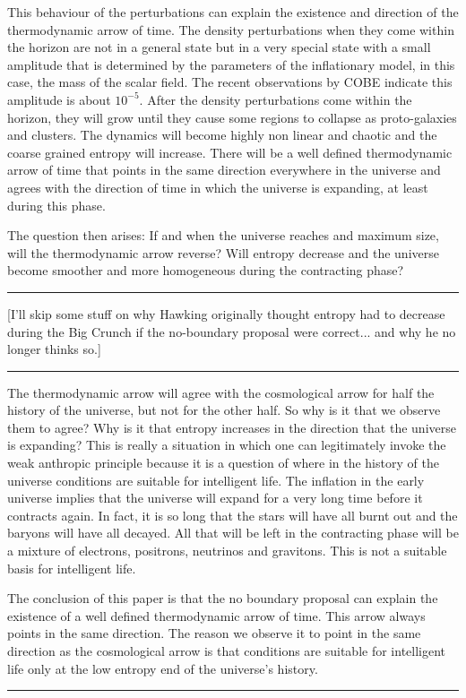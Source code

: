 This behaviour of the perturbations can explain the existence and direction
of the thermodynamic arrow of time. The density perturbations when they
come within the horizon are not in a general state but in a very special
state with a small amplitude that is determined by the parameters of the
inflationary model, in this case, the mass of the scalar field. The recent
observations by COBE indicate this amplitude is about $10^{-5}$. After the
density perturbations come within the horizon, they will grow until they
cause some regions to collapse as proto-galaxies and clusters. The
dynamics will become highly non linear and chaotic and the coarse grained
entropy will increase. There will be a well defined thermodynamic arrow of
time that points in the same direction everywhere in the universe and
agrees with the direction of time in which the universe is expanding, at
least during this phase.

The question then arises: If and when the universe reaches and maximum
size, will the thermodynamic arrow reverse? Will entropy decrease and the
universe become smoother and more homogeneous during the contracting
phase? 
\par\noindent\rule{\textwidth}{0.4pt}

[I'll skip some stuff on why Hawking originally thought entropy
had to decrease during the Big Crunch if the no-boundary proposal
were correct... and why he no longer thinks so.]

\par\noindent\rule{\textwidth}{0.4pt}
The thermodynamic arrow will agree with the cosmological arrow for half the
history of the universe, but not for the other half. So why is it that we
observe them to agree? Why is it that entropy increases in the direction
that the universe is expanding? This is really a situation in which one can
legitimately invoke the weak anthropic principle because it is a question
of where in the history of the universe conditions are suitable for
intelligent life. The inflation in the early universe implies that the
universe will expand for a very long time before it contracts again. In
fact, it is so long that the stars will have all burnt out and the baryons
will have all decayed. All that will be left in the contracting phase will
be a mixture of electrons, positrons, neutrinos and gravitons. This is not
a suitable basis for intelligent life.

The conclusion of this paper is that the no boundary proposal can explain
the existence of a well defined thermodynamic arrow of time. This arrow
always points in the same direction. The reason we observe it to point in
the same direction as the cosmological arrow is that conditions are
suitable for intelligent life only at the low entropy end of the
universe's history.
\par\noindent\rule{\textwidth}{0.4pt}


